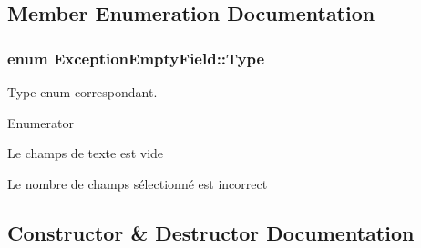 \subsection{Member Enumeration Documentation}
\subsubsection[{\texorpdfstring{Type}{Type}}]{\setlength{\rightskip}{0pt plus 5cm}enum {\bf Exception\+Empty\+Field\+::\+Type}}\hypertarget{class_exception_empty_field_af667c68aa2b6c49ad147004ce9a09584}{}\label{class_exception_empty_field_af667c68aa2b6c49ad147004ce9a09584}


Type enum correspondant. 

\begin{Desc}
\item[Enumerator]\par
\begin{description}
\item[{\em 
E\+M\+P\+T\+Y\+\_\+\+F\+I\+E\+LD\hypertarget{class_exception_empty_field_af667c68aa2b6c49ad147004ce9a09584a6bc8e6b4c1ce816868e981082235660f}{}\label{class_exception_empty_field_af667c68aa2b6c49ad147004ce9a09584a6bc8e6b4c1ce816868e981082235660f}
}]Le champs de texte est vide \item[{\em 
W\+R\+O\+N\+G\+\_\+\+N\+U\+M\+B\+E\+R\+\_\+\+S\+E\+L\+E\+C\+T\+ED\hypertarget{class_exception_empty_field_af667c68aa2b6c49ad147004ce9a09584a9b82c514a396c1eb0789ca58c037c273}{}\label{class_exception_empty_field_af667c68aa2b6c49ad147004ce9a09584a9b82c514a396c1eb0789ca58c037c273}
}]Le nombre de champs sélectionné est incorrect \end{description}
\end{Desc}


\subsection{Constructor \& Destructor Documentation}
